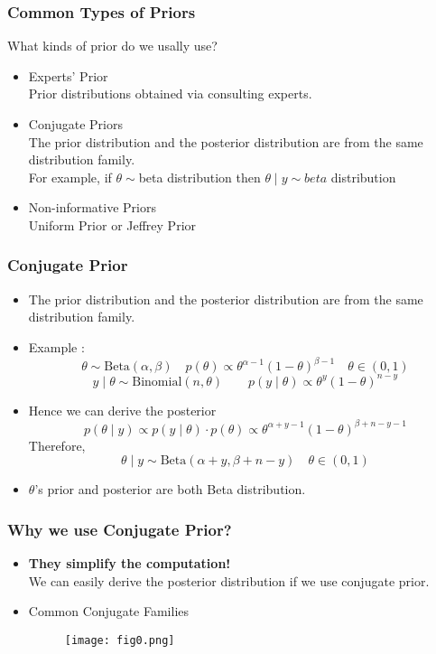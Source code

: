 \documentclass{beamer}
\begin{document}
\begin{frame}
\frametitle{Common Types of Priors}
What kinds of prior do we usally use? 
\begin{itemize}
\item Experts' Prior \\
Prior distributions obtained via consulting experts.
\item Conjugate Priors\\
The prior distribution and the posterior distribution are from the same distribution family.\\
For example, if $\theta \sim $beta distribution then $\theta\mid y \sim beta$ distribution
\item Non-informative Priors\\
Uniform Prior or Jeffrey Prior
\end{itemize}
\end{frame}


\begin{frame}
\frametitle{Conjugate Prior}
\begin{itemize}
\item The prior distribution and the posterior distribution are from the same distribution family.
\item Example : $$\theta \sim \text{Beta}(\alpha,\beta) \quad p(\theta) \propto \theta^{\alpha -1}(1 - \theta)^{\beta - 1} \quad \theta \in (0,1) $$
$$y\mid \theta \sim \text{Binomial}(n,\theta) \quad \quad p(y\mid \theta) \propto \theta^{y}(1 - \theta)^{n-y}$$
\item Hence we can derive the posterior $$p(\theta\mid y) \propto p(y\mid \theta)\cdot p(\theta) \propto \theta^{\alpha + y -1}(1 - \theta)^{\beta +n - y - 1}$$
Therefore, $$\theta \mid y \sim \text{Beta}(\alpha + y,\beta +n - y) \quad \theta \in (0,1) $$ 
\item $\theta$'s prior and posterior are both Beta distribution.
\end{itemize}
\end{frame}

\begin{frame}
\frametitle{Why we use Conjugate Prior?} 
\begin{itemize}
\item {\bf They simplify the computation!}\\
We can easily derive the posterior distribution if we use conjugate prior.
\item Common Conjugate Families
\begin{figure}
\texttt{[image: fig0.png]}\\
\footnotesize{}
\end{figure}
\end{itemize}
\end{frame}
\end{document}
